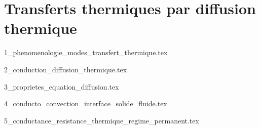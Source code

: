 \chapter[Transferts thermiques]{Transferts thermiques par diffusion thermique}

\minitoc 

{1_phenomenologie_modes_transfert_thermique.tex}

{2_conduction_diffusion_thermique.tex}

{3_proprietes_equation_diffusion.tex}

{4_conducto_convection_interface_solide_fluide.tex}

{5_conductance_resistance_thermique_regime_permanent.tex}